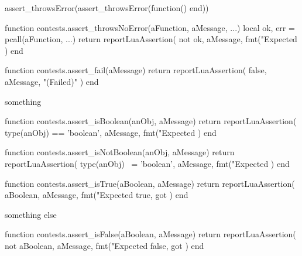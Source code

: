 \startLuaTest
  assert_throwsError(assert_throwsError(function() end))
\stopLuaTest
\stopTestCase

\stopTestSuite



\startLuaCode
function contests.assert_throwsNoError(aFunction, aMessage, ...)
  local ok, err = pcall(aFunction, ...)
  return reportLuaAssertion(
    not ok,
    aMessage,
    fmt("Expected %
  )
end
\stopLuaCode

\stopTestSuite


\startLuaCode
function contests.assert_fail(aMessage)
  return reportLuaAssertion(
    false,
    aMessage,
    "(Failed)"
  )
end
\stopLuaCode


\startLuaTest
  something
\stopLuaTest

\stopTestCase
\stopTestSuite


\startLuaCode
function contests.assert_isBoolean(anObj, aMessage)
  return reportLuaAssertion(
    type(anObj) == 'boolean',
    aMessage,
    fmt("Expected %
  )
end
\stopLuaCode

\stopTestSuite


\startLuaCode
function contests.assert_isNotBoolean(anObj, aMessage)
  return reportLuaAssertion(
    type(anObj) ~= 'boolean',
    aMessage,
    fmt("Expected %
  )
end
\stopLuaCode

\stopTestSuite


\startLuaCode
function contests.assert_isTrue(aBoolean, aMessage)
  return reportLuaAssertion(
    aBoolean,
    aMessage,
    fmt("Expected true, got %
  )
end
\stopLuaCode


\startLuaTest
  something else
\stopLuaTest

\stopTestCase
\stopTestSuite


\startLuaCode
function contests.assert_isFalse(aBoolean, aMessage)
  return reportLuaAssertion(
    not aBoolean,
    aMessage,
    fmt("Expected false, got %
  )
end
\stopLuaCode

